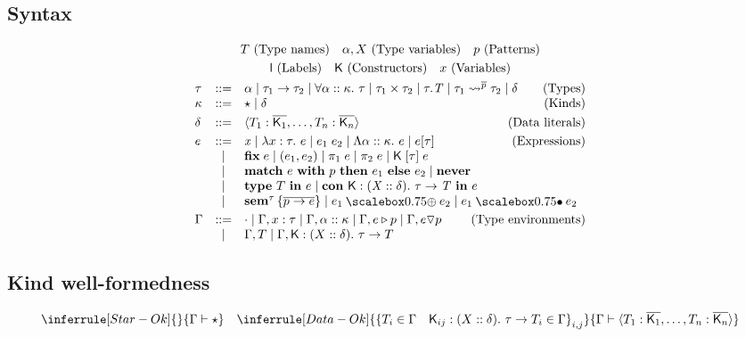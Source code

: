\documentclass{article}
\newcommand{\fnlab}[1]{\ensuremath{\mathsf{#1}}}
\begin{document}
\subsection*{Syntax}
\begin{gather*}
  T~\text{(Type names)}\quad \alpha,X~\text{(Type variables)}\quad p~\text{(Patterns)} \\
  \fnlab{l}~\text{(Labels)}\quad \fnlab{K}~\text{(Constructors)} \quad x~\text{(Variables)} \\
  \begin{array}{lcl}
    \tau &::=& \tyvar{\alpha} \mid \tyarr{\tau_1}{\tau_2} \mid \tyall{\alpha}{\kappa}{\tau} \mid \typrod{\tau_1}{\tau_2} \mid \tydata{\tau}{T} \mid \tysquig{\tau_1}{\overline{p}}{\tau_2} \mid \delta \qquad\hfill\text{(Types)}\\
    \kappa &::=& \kitype{} \mid \delta \qquad\hfill\text{(Kinds)}\\[1mm]
    \delta &::=& \dtlit{T_1:\overline{\fnlab{K}_1}, \ldots, T_n:\overline{\fnlab{K}_n}} \qquad\hfill\text{(Data literals)}\\[1mm]
    e &::=& \tmvar{x} \mid \tmlam{x}{\tau}{e} \mid \tmapp{e_1}{e_2} \mid \tmtylam{\alpha}{\kappa}{e} \mid \tmtyapp{e}{\tau} \qquad\hfill\text{(Expressions)}\\
         & \mid & \tmfix{e} \mid \tmprod{e_1}{e_2} \mid \tmproj{1}{e} \mid \tmproj{2}{e} \mid \tmconapp{K}{\tau}{e} \\
         & \mid & \tmmatch{e}{p}{e_1}{e_2} \mid \tmnever{} \\
         & \mid & \tmtype{T}{e} \mid \tmcondef{K}{X}{\delta}{\tau}{T}{e} \\
         & \mid & \tmsem{\tau}{\overline{p \to e}} \mid \tmcomp{e_1}{e_2} \mid \tmsemapp{e_1}{e_2}\\[1mm]
    \Gamma &::=& \cdot \mid \Gamma, x : \tau \mid \Gamma, \alpha :: \kappa \mid \Gamma, e \triangleright p \mid \Gamma, e \triangledown p \qquad\hfill\text{(Type environments)}\\
         &\mid& \Gamma, T \mid \Gamma, \fnlab{K} : (X :: \delta).~\tau \to T
  \end{array}
\end{gather*}
\subsection*{Kind well-formedness}
\[
  \inferrule[Star-Ok] { }
  { \Gamma \vdash \star }
  \quad
  \inferrule[Data-Ok]
  { \left \{ T_i \in \Gamma \quad \fnlab{K}_{ij} : (X :: \delta).~\tau \to T_i \in \Gamma \right \}_{i,j} }
  { \Gamma \vdash \dtlit{T_1:\overline{\fnlab{K}_1}, \ldots , T_n:\overline{\fnlab{K}_n}} }
\]
\end{document}
